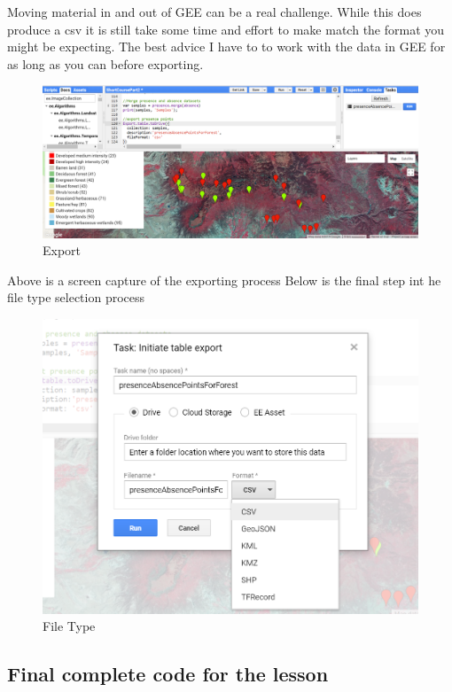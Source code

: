 \documentclass[]{article}
\begin{document}
 Moving material in and out of GEE can be a real challenge. While this
does produce a csv it is still take some time and effort to make match
the format you might be expecting. The best advice I have to to work
with the data in GEE for as long as you can before exporting.

\begin{figure}
\centering
\includegraphics{Export_presence_absence_data2.png}
\caption{Export}
\end{figure}

Above is a screen capture of the exporting process Below is the final
step int he file type selection process

\begin{figure}
\centering
\includegraphics{File_type.png}
\caption{File Type}
\end{figure}

\subsection{Final complete code for the
lesson}\label{final-complete-code-for-the-lesson}
\end{document}

